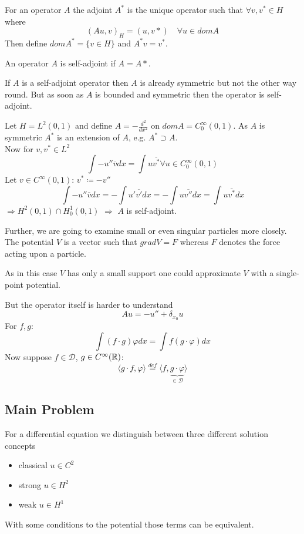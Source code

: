 \begin{definition}
	For an operator $A$ the adjoint $A^{*}$ is the unique operator such that $\forall v, v^{*} \in H$ where
	\[ (A u , v)_{H} = ( u , v* ) \quad \forall u \in dom A \]
	Then define $dom A^{*} = \{ v \in H \}$ and $A^{*} v = v^{*}$.
\end{definition}

\begin{definition}
	An operator $A$ is self-adjoint if $A = A*$.
\end{definition}
	
If $A$ is a self-adjoint operator then $A$ is already symmetric but not the other way round. But as soon as $A$ is bounded and symmetric then the operator is self-adjoint.


\begin{example}
	Let $H = L^{2}(0, 1)$ and define $A = - \frac{d^{2}}{dx^{2}}$ on $dom A = C_{0}^{\infty}(0,1)$. As $A$ is symmetric $A^{*}$ is an extension of $A$, e.g. $A^{*} \supset A$. \\
	Now for $v, v^{*} \in L^{2}$
		\[ \int - u'' \overline{v} dx = \int u \overline{v^{*}} \forall u \in C_{0}^{\infty}(0, 1) \]
	Let $v \in C^{\infty}(0, 1)$: $v^{*} \coloneqq - v''$
		\[ \int - u'' \overline{v} dx = - \int u' \overline{v'} dx = - \int u \overline{v''} dx = \int u \overline{v^{*}} dx \]
	$\Rightarrow H^{2}(0, 1) \cap H_{0}^{1}(0, 1)$ $\Rightarrow$ $A$ is self-adjoint.
\end{example}
	
Further, we are going to examine small or even singular particles more closely.  The potential $V$ is a vector such that $grad V = F$ whereas $F$ denotes the force acting upon a particle.

	As in this case $V$ has only a small support one could approximate $V$ with a single-point potential.
	
	But the operator itself is harder to understand
		\[ A u = - u'' + \delta_{x_{0}} u \]
	For $f, g$:
		\[ \int \left( f \cdot g \right) \varphi dx = \int f \left( g \cdot \varphi \right) dx \]
	Now suppose $f \in \mathcal{D}$, $g \in C^{\infty}(\mathbb{R})$:
		\[ \langle g \cdot f , \varphi \rangle \overset{def}{=} \langle f , \underbrace{g \cdot \varphi}_{\in \mathcal{D}} \rangle \]	
	
\subsection{Main Problem}

For a differential equation we distinguish between three different solution concepts
\begin{itemize}
	\item classical $u \in C^{2}$
	\item strong $u \in H^{2}$
	\item weak $u \in H^{1}$
\end{itemize}
With some conditions to the potential those terms can be equivalent.

